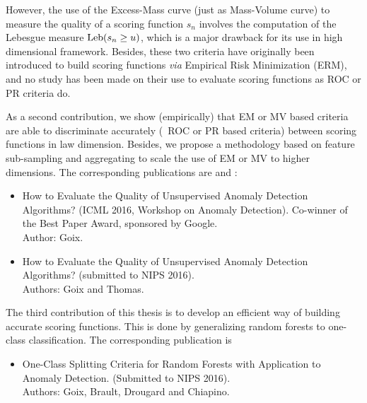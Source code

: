 However, the use of the Excess-Mass curve (just as Mass-Volume curve) to measure the quality of a scoring function $s_n$ involves the computation of the Lebesgue measure  $\text{Leb}(s_n \ge u)$, which is a major drawback for its use in high dimensional framework. Besides, these two criteria
have originally been introduced to build scoring functions \emph{via}
Empirical Risk Minimization (ERM), and no study has been made on their use to evaluate scoring functions as ROC or PR criteria do.

As a second contribution, we show (empirically) that EM or MV based criteria are able to discriminate accurately (\wrt~ROC or PR based criteria) between scoring functions in law dimension. Besides, we propose a methodology based on feature sub-sampling and aggregating to scale the use of EM or MV to higher dimensions.
The corresponding publications are \cite{ICMLworkshop16} and \cite{NIPS16evaluation}:
\begin{itemize}
\item How to Evaluate the Quality of Unsupervised Anomaly Detection Algorithms? (ICML 2016, Workshop on Anomaly Detection). Co-winner of the Best Paper Award, sponsored by Google.\\
Author: Goix. 
\item How to Evaluate the Quality of Unsupervised Anomaly Detection Algorithms? (submitted to NIPS 2016).\\ Authors: Goix and Thomas. 
\end{itemize}


The third contribution of this thesis is to develop an efficient way of building accurate scoring functions. This is done by generalizing random forests to one-class classification. The corresponding publication is 
\begin{itemize}
\item One-Class Splitting Criteria for Random Forests with Application to Anomaly Detection. (Submitted to NIPS 2016).\\
Authors: Goix, Brault, Drougard and Chiapino.
\end{itemize}



